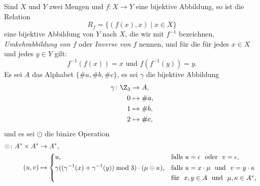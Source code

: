 \documentclass[12pt]{article}
\begin{document}

\begin{aufgabe}[1,5 + 1,5 + 3 = 6]
  Sind $X$ und $Y$ zwei Mengen und $f \colon X \to Y$ eine bijektive Abbildung,
  so ist die Relation
  \begin{equation*}
    R_f = \{ (f(x), x) \mid x \in X \}
  \end{equation*}
  eine bijektive Abbildung von $Y$ nach $X$, die wir mit $f^{-1}$ bezeichnen,
  \emph{Umkehrabbildung von $f$} oder \emph{Inverse von $f$} nennen, und für
  die für jedes $x \in X$ und jedes $y \in Y$ gilt:
  \begin{equation*}
    f^{-1}(f(x)) = x \text{ und } f(f^{-1}(y)) = y.
  \end{equation*}
  Es sei $A$ das Alphabet $\{ \#a, \#b, \#c \}$, es sei $\gamma$ die bijektive
  Abbildung
  \begin{align*}
    \gamma \colon \Z_3 &\to     A,\\
                     0 &\mapsto \#a,\\
                     1 &\mapsto \#b,\\
                     2 &\mapsto \#c,
  \end{align*}
  und es sei $\odot$ die binäre Operation
  \begin{align*}
    \odot \colon A^* \times A^* &\to     A^*,\\
                         (u, v) &\mapsto \begin{dcases*}
                                           u,                                                                          &falls $u = \epsilon$ \text{ oder } $v = \epsilon$,\\
                                           \gamma((\gamma^{-1}(x) + \gamma^{-1}(y)) \bmod 3) \cdot (\mu \odot \kappa), &falls $u = x \cdot \mu$ \text{ und } $v = y \cdot \kappa$\\
                                                                                                                       &\text{für } $x, y \in A$ \text{ und } $\mu, \kappa \in A^*$,
                                         \end{dcases*}
  \end{align*}

\end{aufgabe}
\end{document}
